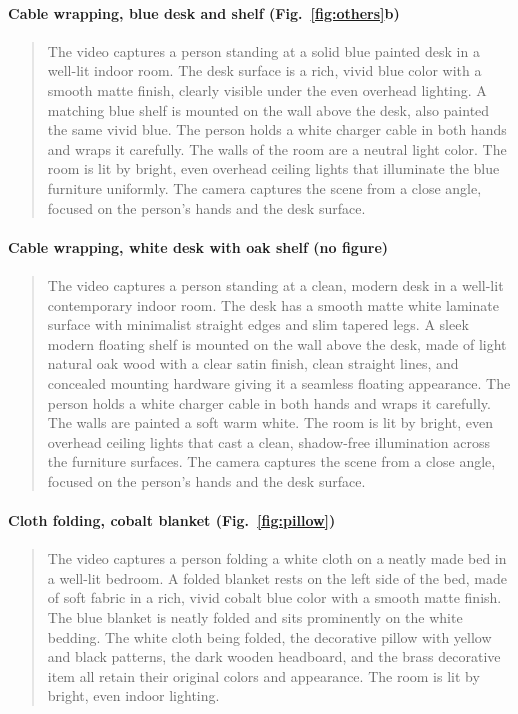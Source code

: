 \paragraph{Cable wrapping, blue desk and shelf (Fig.~\ref{fig:others}b)}
\begin{quote}\small
The video captures a person standing at a solid blue painted desk in a well-lit indoor room. The desk surface is a rich, vivid blue color with a smooth matte finish, clearly visible under the even overhead lighting. A matching blue shelf is mounted on the wall above the desk, also painted the same vivid blue. The person holds a white charger cable in both hands and wraps it carefully. The walls of the room are a neutral light color. The room is lit by bright, even overhead ceiling lights that illuminate the blue furniture uniformly. The camera captures the scene from a close angle, focused on the person's hands and the desk surface.
\end{quote}

\paragraph{Cable wrapping, white desk with oak shelf (no figure)}
\begin{quote}\small
The video captures a person standing at a clean, modern desk in a well-lit contemporary indoor room. The desk has a smooth matte white laminate surface with minimalist straight edges and slim tapered legs. A sleek modern floating shelf is mounted on the wall above the desk, made of light natural oak wood with a clear satin finish, clean straight lines, and concealed mounting hardware giving it a seamless floating appearance. The person holds a white charger cable in both hands and wraps it carefully. The walls are painted a soft warm white. The room is lit by bright, even overhead ceiling lights that cast a clean, shadow-free illumination across the furniture surfaces. The camera captures the scene from a close angle, focused on the person's hands and the desk surface.
\end{quote}

\paragraph{Cloth folding, cobalt blanket (Fig.~\ref{fig:pillow})}
\begin{quote}\small
The video captures a person folding a white cloth on a neatly made bed in a well-lit bedroom. A folded blanket rests on the left side of the bed, made of soft fabric in a rich, vivid cobalt blue color with a smooth matte finish. The blue blanket is neatly folded and sits prominently on the white bedding. The white cloth being folded, the decorative pillow with yellow and black patterns, the dark wooden headboard, and the brass decorative item all retain their original colors and appearance. The room is lit by bright, even indoor lighting.
\end{quote}

